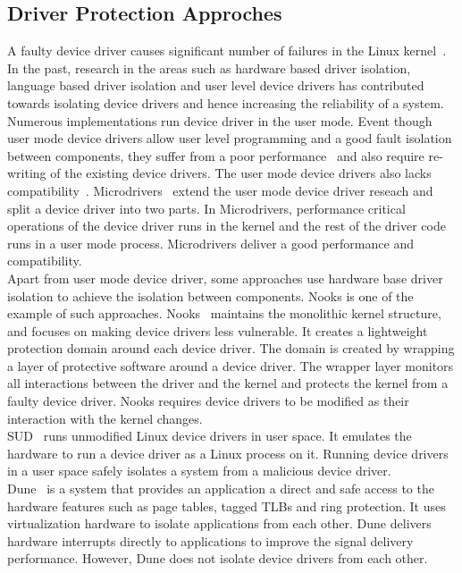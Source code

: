 \subsection{Driver Protection Approches}
A faulty device driver causes significant number of failures in the Linux kernel~\cite{tanenbaum2006can, coveritykernel}. In the past, research in the areas such as hardware based driver isolation, language based driver isolation and user level device drivers has contributed towards isolating device drivers and hence increasing the reliability of a system.
\\[3mm]
Numerous implementations run device driver in the user mode. Event though user mode device drivers allow user level programming and a good fault isolation between components, they suffer from a poor performance~\cite{armand1991give} and also require re-writing of the existing device drivers. The user mode device drivers also lacks compatibility~\cite{Leslie+:jcst2005}. Microdrivers~\cite{Ganapathy:2008:DIM:1346281.1346303} extend the user mode device driver reseach and split a device driver into two parts. In Microdrivers, performance critical operations of the device driver runs in the kernel and the rest of the driver code runs in a user mode process. Microdrivers deliver a good performance and compatibility.
\\[3mm]
Apart from user mode device driver, some approaches use hardware base driver isolation to achieve the isolation between components. Nooks is one of the example of such approaches. Nooks~\cite{swift2005improving} maintains the monolithic kernel structure, and focuses on making device drivers less vulnerable. It creates a lightweight protection domain around each device driver. The domain is created by wrapping a layer of protective software around a device driver. The wrapper layer monitors all interactions between the driver and the kernel and protects the kernel from a faulty device driver. Nooks requires device drivers to be modified as their interaction with the kernel changes. 
\\[3mm]
SUD~\cite{Boyd-Wickizer+:atc2010} runs unmodified Linux device drivers in user space. It emulates the hardware to run a device driver as a Linux process on it. Running device drivers in a user space safely isolates a system from a malicious device driver. 
\\[3mm]
Dune~\cite{Belay+:osdi12} is a system that provides an application a direct and safe access to the hardware features such as page tables, tagged TLBs and ring protection. It uses virtualization hardware to isolate applications from each other. Dune delivers hardware interrupts directly to applications to improve the signal delivery performance. However, Dune does not isolate device drivers from each other.

